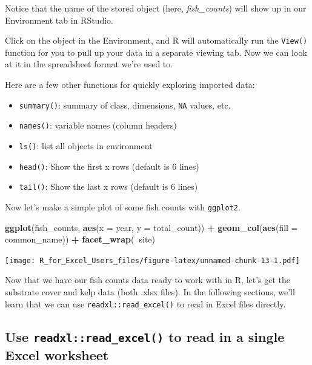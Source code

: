 \documentclass[]{book}
\newenvironment{Shaded}{\begin{snugshade}}{\end{snugshade}}
\newcommand{\DataTypeTok}[1]{\textcolor[rgb]{0.13,0.29,0.53}{#1}}
\newcommand{\KeywordTok}[1]{\textcolor[rgb]{0.13,0.29,0.53}{\textbf{#1}}}
\newcommand{\NormalTok}[1]{#1}
\newcommand{\OperatorTok}[1]{\textcolor[rgb]{0.81,0.36,0.00}{\textbf{#1}}}
\newcommand{\StringTok}[1]{\textcolor[rgb]{0.31,0.60,0.02}{#1}}
\providecommand{\tightlist}{%
  \setlength{\itemsep}{0pt}\setlength{\parskip}{0pt}}
\begin{document}
Notice that the name of the stored object (here, \emph{fish\_counts}) will show up in our Environment tab in RStudio.

Click on the object in the Environment, and R will automatically run the \texttt{View()} function for you to pull up your data in a separate viewing tab. Now we can look at it in the spreadsheet format we're used to.

Here are a few other functions for quickly exploring imported data:

\begin{itemize}
\tightlist
\item
  \texttt{summary()}: summary of class, dimensions, \texttt{NA} values, etc.
\item
  \texttt{names()}: variable names (column headers)
\item
  \texttt{ls()}: list all objects in environment
\item
  \texttt{head()}: Show the first x rows (default is 6 lines)
\item
  \texttt{tail()}: Show the last x rows (default is 6 lines)
\end{itemize}

Now let's make a simple plot of some fish counts with \texttt{ggplot2}.

\begin{Shaded}
\begin{Highlighting}[]
\KeywordTok{ggplot}\NormalTok{(fish_counts, }\KeywordTok{aes}\NormalTok{(}\DataTypeTok{x =}\NormalTok{ year, }\DataTypeTok{y =}\NormalTok{ total_count)) }\OperatorTok{+}
\StringTok{  }\KeywordTok{geom_col}\NormalTok{(}\KeywordTok{aes}\NormalTok{(}\DataTypeTok{fill =}\NormalTok{ common_name)) }\OperatorTok{+}
\StringTok{  }\KeywordTok{facet_wrap}\NormalTok{(}\OperatorTok{~}\NormalTok{site)}
\end{Highlighting}
\end{Shaded}

\texttt{[image: R\_for\_Excel\_Users\_files/figure-latex/unnamed-chunk-13-1.pdf]}

Now that we have our fish counts data ready to work with in R, let's get the substrate cover and kelp data (both .xlsx files). In the following sections, we'll learn that we can use \texttt{readxl::read\_excel()} to read in Excel files directly.

\hypertarget{use-readxlread_excel-to-read-in-a-single-excel-worksheet}{%
\subsection{\texorpdfstring{Use \texttt{readxl::read\_excel()} to read in a single Excel worksheet}{Use readxl::read\_excel() to read in a single Excel worksheet}}\label{use-readxlread_excel-to-read-in-a-single-excel-worksheet}}
\end{document}
